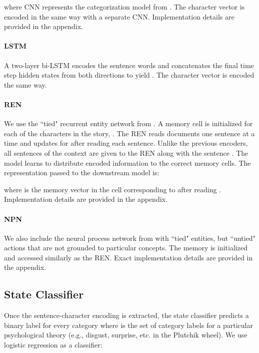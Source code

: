 \documentclass[11pt,a4paper]{article}
\begin{document}
\noindent where CNN represents the categorization model from \citep{Kim2014ConvolutionalNN}. The character vector  is encoded in the same way with a separate CNN. Implementation details are provided in the appendix.

\paragraph{LSTM} 
A two-layer bi-LSTM encodes the sentence words and concatenates the final time step hidden states from both directions to yield . The character vector  is encoded the same way.





\paragraph{REN} We use the ``tied" recurrent entity network from \citet{ren}. A memory cell  is initialized for each of the  characters in the story, . The REN reads documents one sentence at a time and updates  for  after reading each sentence. Unlike the previous encoders, all sentences of the context  are given to the REN along with the sentence . The model learns to distribute encoded information to the correct memory cells. The representation passed to the downstream model is:
\vspace*{-1mm}


\noindent where  is the memory vector in the cell corresponding to  after reading . Implementation details are provided in the appendix. 

\paragraph{NPN} We also include the neural process network from \citet{Bosselut17} with ``tied" entities, but ``untied" actions that are not grounded to particular concepts. The memory is initialized and accessed similarly as the REN. Exact implementation details are provided in the appendix.

\subsection{State Classifier}
\label{ssec:model:class}
Once the sentence-character encoding  is extracted, the state classifier predicts a binary label  for every category  where  is the set of category labels for a particular psychological theory (e.g., disgust, surprise, etc. in the Plutchik wheel). We use logistic regression as a classifier:
\vspace*{-1mm}
\end{document}
